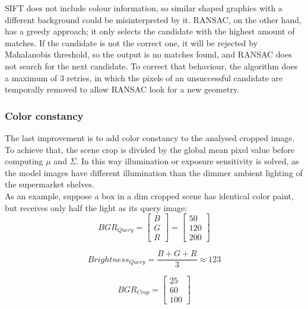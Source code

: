 \documentclass[12pt]{article}
\begin{document}
SIFT does not include colour information, so similar shaped graphics with a different background could be misinterpreted by it. RANSAC, on the other hand, has a greedy approach; it only selects the candidate with the highest amount of matches. If the candidate is not the correct one, it will be rejected by Mahalanobis threshold, so the output is no matches found, and RANSAC does not search for the next candidate. To correct that behaviour, the algorithm does a maximum of 3 retries, in which the pixels of an unsuccessful candidate are temporally removed to allow RANSAC look for a new geometry.


\subsubsection{Color constancy}

The last improvement is to add color constancy to the analysed cropped image. To achieve that, the scene crop is divided by the global mean pixel value before computing $\mu$ and $\Sigma$. In this way illumination or exposure sensitivity is solved, as the model images have different illumination than the dimmer ambient lighting of the supermarket shelves.\\

As an example, suppose a box in a dim cropped scene has identical color paint, but receives only half the light as its query image:\\
\begin{equation}
BGR_{Query} = \begin{bmatrix}
B\\
G\\
R
\end{bmatrix} = \begin{bmatrix}
50\\
120\\
200
\end{bmatrix}
\end{equation}

\begin{equation}
Brightness_{Query} = \frac{B+G+R}{3} \approx 123
\end{equation}


\begin{equation}
BGR_{Crop} = \begin{bmatrix}
25\\
60\\
100
\end{bmatrix}
\end{equation}
\end{document}
